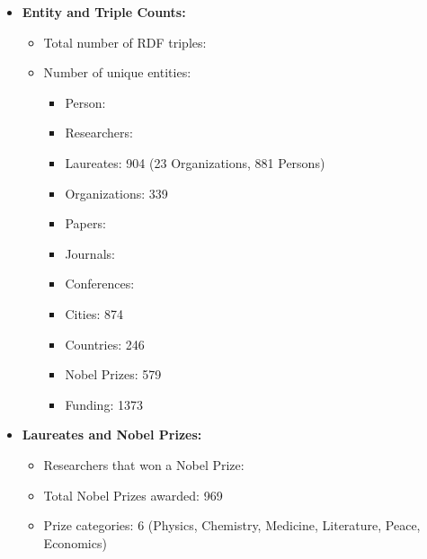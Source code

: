 \documentclass{article}
\begin{document}
\begin{itemize}
	\item \textbf{Entity and Triple Counts:}
	      \begin{itemize}
		      \item Total number of RDF triples: %
		      \item Number of unique entities:
		            \begin{itemize}
			            \item Person: %
			            \item Researchers: %
			            \item Laureates: 904 (23 Organizations, 881 Persons)
			            \item Organizations: 339
			            \item Papers: %
			            \item Journals: %
			            \item Conferences: %
			            \item Cities: 874
			            \item Countries: 246
			            \item Nobel Prizes: 579
			            \item Funding: 1373
		            \end{itemize}
	      \end{itemize}

	\item \textbf{Laureates and Nobel Prizes:}
	      \begin{itemize}
		      \item Researchers that won a Nobel Prize: %
		      \item Total Nobel Prizes awarded: 969
		      \item Prize categories: 6 (Physics, Chemistry, Medicine, Literature, Peace, Economics)
	      \end{itemize}
\end{itemize}
\end{document}

